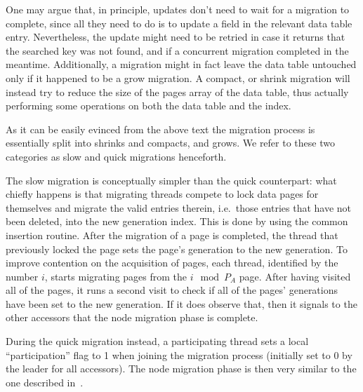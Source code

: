 One may argue that, in principle, updates don't need to wait for a migration to complete, since all they need to do is to update a field in the relevant data table entry.
Nevertheless, the update might need to be retried in case it returns that the searched key was not found, and if a concurrent migration completed in the meantime.
Additionally, a migration might in fact leave the data table untouched only if it happened to be a grow migration.
A compact, or shrink migration will instead try to reduce the size of the pages array of the data table, thus actually performing some operations on both the data table and the index.

As it can be easily evinced from the above text the migration process is essentially split into shrinks and compacts, and grows.
We refer to these two categories as slow and quick migrations henceforth.

The slow migration is conceptually simpler than the quick counterpart: what chiefly happens is that migrating threads compete to lock data pages for themselves and migrate the valid entries therein, i.e.\ those entries that have not been deleted, into the new generation index.
This is done by using the common insertion routine.
After the migration of a page is completed, the thread that previously locked the page sets the page's generation to the new generation.
To improve contention on the acquisition of pages, each thread, identified by the number $i$, starts migrating pages from the $i \mod P_A$ page.
After having visited all of the pages, it runs a second visit to check if all of the pages' generations have been set to the new generation.
If it does observe that, then it signals to the other accessors that the node migration phase is complete.

During the quick migration instead, a participating thread sets a local ``participation'' flag to 1 when joining the migration process (initially set to 0 by the leader for all accessors).
The node migration phase is then very similar to the one described in~\cite[\S5.3.1]{maier}.

